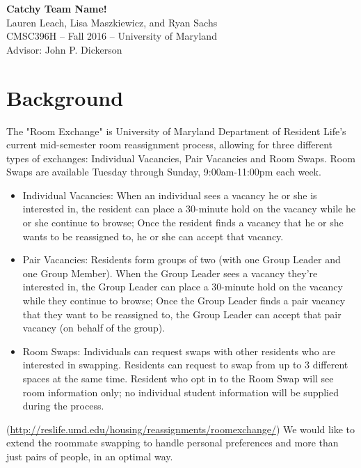 \documentclass[12pt]{article}
\begin{document}
\begin{center}
{\Large \textbf{Catchy Team Name!}}\\
Lauren Leach, Lisa Maszkiewicz, and Ryan Sachs\\
CMSC396H -- Fall 2016 -- University of Maryland\\
Advisor: John P. Dickerson
\end{center}

\section*{Background}
The "Room Exchange" is University of Maryland Department of Resident Life's current mid-semester room reassignment process, allowing for three different types of exchanges: Individual Vacancies, Pair Vacancies and Room Swaps. Room Swaps are available Tuesday through Sunday, 9:00am-11:00pm each week.
\begin{itemize}
\item Individual Vacancies: When an individual sees a vacancy he or she is interested in, the resident can place a 30-minute hold on the vacancy while he or she continue to browse; Once the resident finds a vacancy that he or she wants to be reassigned to, he or she can accept that vacancy.
\item Pair Vacancies: Residents form groups of two (with one Group Leader and one Group Member). When the Group Leader sees a vacancy they're interested in, the Group Leader can place a 30-minute hold on the vacancy while they continue to browse; Once the Group Leader finds a pair vacancy that they want to be reassigned to, the Group Leader can accept that pair vacancy (on behalf of the group).
\item Room Swaps: Individuals can request swaps with other residents who are interested in swapping. Residents can request to swap from up to 3 different spaces at the same time. Resident who opt in to the Room Swap will see room information only; no individual student information will be supplied during the process.
\end{itemize}
(\url{http://reslife.umd.edu/housing/reassignments/roomexchange/})
We would like to extend the roommate swapping to handle personal preferences and more than just pairs of people, in an optimal way. 
\end{document}
